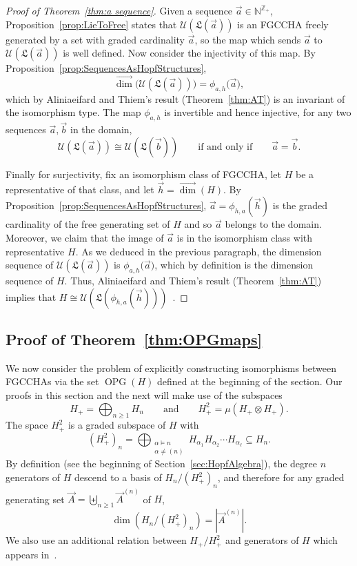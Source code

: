 \documentclass[11pt]{amsart}
\theoremstyle{definition}
\numberwithin{equation}{section}
\def\NN{{\mathbb N}}
\def\ZZ{{\mathbb Z}}
\newcommand{\FGCCHA}{\textsf{FGCCHA}\xspace}
\newcommand{\FGCCHAs}{\textsf{FGCCHA}s\xspace}
\newcommand{\vecdim}{\overrightarrow{\dim}}
\newcommand{\OPG}{\operatorname{OPG}}
\begin{document}
\begin{proof}[Proof of Theorem~\ref{thm:a sequence}]
Given a sequence $\vec{a} \in \NN^{\ZZ_+}$, Proposition~\ref{prop:LieToFree} states that
$\mathcal{U}(\mathfrak{L}(\vec{a}))$ is an \FGCCHA freely generated by a set with graded
cardinality $\vec{a}$, so the map which sends $\vec{a}$ to $\mathcal{U}(\mathfrak{L}(\vec{a}))$ is well defined.
Now consider the injectivity of this map.
By Proposition~\ref{prop:SequencesAsHopfStructures},
\[
\vecdim\big(\mathcal{U}(\mathfrak{L}(\vec{a}))\big) = \phi_{a, h}\big(\vec{a}),
\]
which by Aliniaeifard and Thiem's result (Theorem~\ref{thm:AT}) is an invariant of the isomorphism type.
The map $\phi_{a, h}$ is invertible and hence injective,
for any two sequences $\vec{a}, \vec{b}$ in the domain,
\[
\mathcal{U}(\mathfrak{L}(\vec{a})) \cong \mathcal{U}(\mathfrak{L}(\vec{b}))
\qquad\text{if and only if}\qquad
\vec{a} = \vec{b}.
\]

Finally for surjectivity, fix an isomorphism class of \FGCCHA, let $H$ be a representative of that class, and let $\vec{h} = \vecdim(H)$.
By Proposition~\ref{prop:SequencesAsHopfStructures},
$\vec{a} = \phi_{h, a}(\vec{h})$ is the graded cardinality of the free generating set
of $H$ and so
$\vec{a}$ belongs to the domain.  
Moreover, we claim that the image of $\vec{a}$ is in the isomorphism class with representative $H$.  
As we deduced in the previous paragraph, the dimension sequence of
$\mathcal{U}(\mathfrak{L}(\vec{a}))$ is $\phi_{a, h}\big(\vec{a})$, which by definition is the dimension sequence of $H$.  
Thus, Aliniaeifard and Thiem's result (Theorem~\ref{thm:AT})
implies that $H \cong \mathcal{U}(\mathfrak{L}(\phi_{h, a}(\vec{h})))$~.
\end{proof}


\subsection{Proof of Theorem~\ref{thm:OPGmaps}}
\label{sec:OPGproof}

We now consider the problem of explicitly constructing isomorphisms between \FGCCHAs via the set $\OPG(H)$ defined at the beginning of the section.  Our proofs in this section and the next will make use of the subspaces
\[
H_{+} = \bigoplus_{n \geq 1} H_n
\qquad\text{and}\qquad 
H^{2}_{+} = \mu(H_{+} \otimes H_{+}).
\]
The space $H^{2}_{+}$ is a graded subspace of $H$ with
\begin{equation}
\label{eq:Hplusdef}
(H^{2}_{+})_{n} = \bigoplus_{\substack{\alpha \vDash n \\ \alpha \neq (n)}}
H_{\alpha_{1}} H_{\alpha_{2}}\cdots H_{\alpha_{\ell}} \subseteq H_{n}.
\end{equation}
By definition (see the beginning of Section~\ref{sec:HopfAlgebra}), the degree $n$ generators of $H$ descend to a basis of $H_{n}/ (H^{2}_{+})_{n}$, and therefore for any graded generating set $\vec{A} = \biguplus_{n \ge 1} \vec{A}^{(n)}$ of $H$, 
\[
\dim(H_{n}/(H^{2}_{+})_{n}) = |\vec{A}^{(n)}|.
\]
We also use an additional relation between $H_{+}/H^{2}_{+}$ and generators of $H$ which appears in~\cite{F23}.
\end{document}
